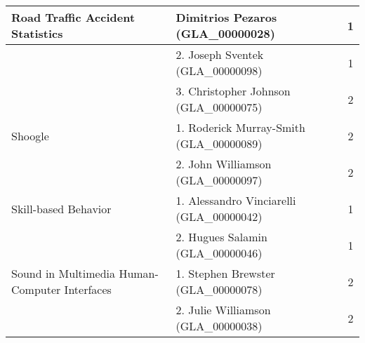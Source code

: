 \begin{longtable}{|l|l|c|}
\hline Road Traffic Accident Statistics & Dimitrios Pezaros (GLA\_00000028) & 1 \\ 
\hline  & 2. Joseph Sventek (GLA\_00000098) & 1 \\ 
\hline  & 3. Christopher Johnson (GLA\_00000075) & 2 \\ 
\hline Shoogle & 1. Roderick Murray-Smith (GLA\_00000089) & 2 \\ 
\hline  & 2. John Williamson (GLA\_00000097) & 2 \\ 
\hline Skill-based Behavior & 1. Alessandro Vinciarelli (GLA\_00000042) & 1 \\ 
\hline  & 2. Hugues Salamin (GLA\_00000046) & 1 \\ 
\hline Sound in Multimedia Human-Computer Interfaces & 1. Stephen Brewster (GLA\_00000078) & 2  \\ 
\hline  & 2. Julie Williamson (GLA\_00000038) & 2 \\ 


\end{longtable}
